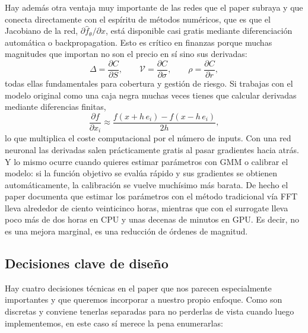 \documentclass[11pt,a4paper]{article}
\begin{document}
Hay además otra ventaja muy importante de las redes que el paper subraya y que conecta directamente con el espíritu de métodos numéricos, que es que el Jacobiano de la red, $\partial \hat{f}_\theta / \partial x$, está disponible casi gratis mediante diferenciación automática o backpropagation. Esto es crítico en finanzas porque muchas magnitudes que importan no son el precio en sí sino sus derivadas:
\begin{equation}
\Delta = \frac{\partial C}{\partial S}, \qquad \mathcal{V} = \frac{\partial C}{\partial \sigma}, \qquad \rho = \frac{\partial C}{\partial r},
\end{equation}
todas ellas fundamentales para cobertura y gestión de riesgo. Si trabajas con el modelo original como una caja negra muchas veces tienes que calcular derivadas mediante diferencias finitas,
\begin{equation}
\frac{\partial f}{\partial x_i} \approx \frac{f(x + h\, e_i) - f(x - h\, e_i)}{2h},
\end{equation}
lo que multiplica el coste computacional por el número de inputs. Con una red neuronal las derivadas salen prácticamente gratis al pasar gradientes hacia atrás. Y lo mismo ocurre cuando quieres estimar parámetros con GMM o calibrar el modelo: si la función objetivo se evalúa rápido y sus gradientes se obtienen automáticamente, la calibración se vuelve muchísimo más barata. De hecho el paper documenta que estimar los parámetros con el método tradicional vía FFT lleva alrededor de ciento veinticinco horas, mientras que con el surrogate lleva poco más de dos horas en CPU y unas decenas de minutos en GPU. Es decir, no es una mejora marginal, es una reducción de órdenes de magnitud.

\subsection{Decisiones clave de diseño}

Hay cuatro decisiones técnicas en el paper que nos parecen especialmente importantes y que queremos incorporar a nuestro propio enfoque. Como son discretas y conviene tenerlas separadas para no perderlas de vista cuando luego implementemos, en este caso sí merece la pena enumerarlas:
\end{document}

